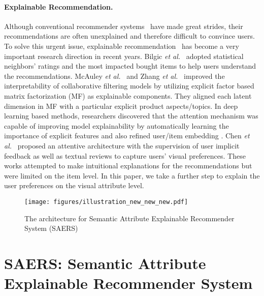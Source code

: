 \documentclass{article}
\begin{document}
\paragraph{Explainable Recommendation.} Although conventional recommender systems~\cite{yu2018multiple,zhu2018deep,liu2011personalized,Li:2018:LHP:3219819.3220014} have made great strides, their recommendations are often unexplained and therefore difficult to convince users. To solve this urgent issue, explainable recommendation~\cite{zhang2018explainable,abdollahi2017accurate} has become a very important research direction in recent years. Bilgic \textit{et al.}~ adopted statistical neighbors' ratings and the most impacted bought items to help users understand the recommendations.  McAuley \textit{et al.}~ and Zhang \textit{et al.}~ improved the interpretability of collaborative filtering models by utilizing explicit factor based matrix factorization (MF) as explainable components. They aligned each latent dimension in MF with a particular explicit product aspects/topics. In deep learning based methods, researchers discovered that the attention mechanism was capable of improving model explainability by automatically learning the importance of explicit features and also refined user/item embedding \cite{chen2018visually,explainable-recommendation-through-attentive-multi-view-learning,chen2017attentive}.  Chen \textit{et al.}~ proposed an attentive architecture with the supervision of user implicit feedback as well as textual reviews to capture users’ visual preferences. These works attempted to make intuitional explanations for the recommendations but were limited on the item level. In this paper, we take a further step to explain the user preferences on the visual attribute level. 
 
 



\begin{figure*}
\texttt{[image: figures/illustration\_new\_new\_new.pdf]}\caption{The architecture for Semantic Attribute Explainable Recommender System (SAERS)}\label{fig:framework}
\end{figure*}





\section{SAERS: Semantic Attribute Explainable Recommender System}
\end{document}
